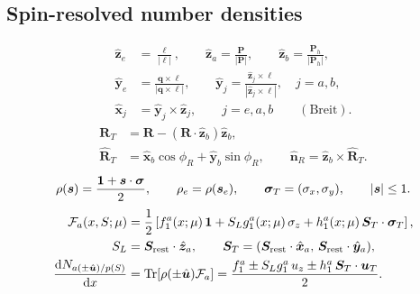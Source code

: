 \documentclass[a4paper,11pt]{article}
\begin{document}
\subsection{Spin-resolved number densities}

\begin{equation}
    \begin{aligned}
        \hat{\bm z}_e&=\frac{\bm\ell}{|\bm\ell|},\qquad
        \hat{\bm z}_a=\frac{\bm P}{|\bm P|},\qquad
        \hat{\bm z}_b=\frac{\bm P_h}{|\bm P_h|},\\
        \hat{\bm y}_e&=\frac{\bm q\times\bm\ell}{|\bm q\times\bm\ell|},\qquad
        \hat{\bm y}_j=\frac{\hat{\bm z}_j\times\bm\ell}
                            {|\hat{\bm z}_j\times\bm\ell|},\quad j=a,b,\\
        \hat{\bm x}_j&=\hat{\bm y}_j\times\hat{\bm z}_j,\qquad j=e,a,b
        \qquad(\mathrm{Breit}).
    \end{aligned}
    \label{eq:sidis-spin-axes}
\end{equation}
\begin{equation}
    \begin{aligned}
        \bm R_T&=\bm R-(\bm R\cdot\hat{\bm z}_b)\hat{\bm z}_b,\\
        \hat{\bm R}_T&=\hat{\bm x}_b\cos\phi_R+\hat{\bm y}_b\sin\phi_R,\qquad
        \hat{\bm n}_R=\hat{\bm z}_b\times\hat{\bm R}_T.
    \end{aligned}
    \label{eq:sidis-azimuths}
\end{equation}
\begin{equation}
    \rho(\bm s)=\frac{\mathbf 1+\bm s\cdot\bm\sigma}{2},\qquad
    \rho_e=\rho(\bm s_e),\qquad
    \bm\sigma_T=(\sigma_x,\sigma_y),\qquad \abs{\bm s}\leq 1 .
    \label{eq:sidis-spin-projector}
\end{equation}
\begin{equation}
    \begin{aligned}
        {\cal F}_a(x,S;\mu)
        &=\frac{1}{2}\left[f_1^a(x;\mu)\,\mathbf 1
            +S_Lg_1^a(x;\mu)\,\sigma_z
            +h_1^a(x;\mu)\,\bm S_T\cdot\bm\sigma_T\right],\\
        S_L&=\bm S_{\rm rest}\cdot\hat{\bm z}_a,\qquad
        \bm S_T=(\bm S_{\rm rest}\cdot\hat{\bm x}_a,\,
                  \bm S_{\rm rest}\cdot\hat{\bm y}_a),\\
        \frac{\dd N_{a(\pm\hat{\bm u})/p(S)}}{\dd x}
        &=\operatorname{Tr}\!\left[\rho(\pm\hat{\bm u}){\cal F}_a\right]
        =\frac{f_1^a\pm S_Lg_1^a\,u_z\pm h_1^a\,\bm S_T\cdot\bm u_T}{2}.
    \end{aligned}
    \label{eq:sidis-spin-pdf}
\end{equation}
\end{document}
